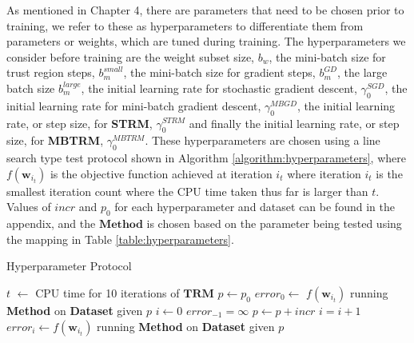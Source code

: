 \documentclass[letterpaper,12pt,titlepage,oneside,final]{book}
\begin{document}
	As mentioned in Chapter 4, there are parameters that need to be chosen prior to training, we refer to these as hyperparameters to differentiate them from parameters or weights, which are tuned during training. The hyperparameters we consider before training are the weight subset size, $b_{w}$, the mini-batch size for trust region steps, $b_{m}^{small}$, the mini-batch size for gradient steps, $b_{m}^{GD}$, the large batch size $b_{m}^{large}$, the initial learning rate for stochastic gradient descent, $\gamma^{SGD}_{0}$, the initial learning rate for mini-batch gradient descent, $\gamma^{MBGD}_{0}$, the initial learning rate, or step size, for \textbf{STRM}, $\gamma^{STRM}_{0}$ and finally the initial learning rate, or step size, for \textbf{MBTRM}, $\gamma^{MBTRM}_{0}$. These hyperparameters are chosen using a line search type test protocol shown in Algorithm \ref{algorithm:hyperparameters}, where $f(\mathbf{w}_{i_{t}})$ is the objective function achieved at iteration $i_{t}$ where iteration $i_{t}$ is the smallest iteration count where the CPU time taken thus far is larger than $t$. Values of $incr$ and $p_{0}$ for each hyperparameter and dataset can be found in the appendix, and the $\mathbf{Method}$ is chosen based on the parameter being tested using the mapping in Table \ref{table:hyperparameters}.
	
	\begin{algorithm}
		\caption{Hyperparameter Protocol}\label{algorithm:hyperparameters}
		\begin{algorithmic}[1]
			\State $t$ $\gets$ CPU time for 10 iterations of $\mathbf{TRM}$
			\State $p \gets p_{0}$
			\State $error_{0} \gets$ $f(\mathbf{w}_{i_{t}})$ running \textbf{Method} on \textbf{Dataset} given $p$
			\State $i \gets 0$
			\State $error_{-1} = \infty$
			\State $p \gets p + incr$
			\State $i = i + 1$
			\State $error_{i} \gets f(\mathbf{w}_{i_{t}})$ running \textbf{Method} on \textbf{Dataset} given $p$
			\EndWhile
			\EndProcedure
		\end{algorithmic}
	\end{algorithm}
	
\end{document}
